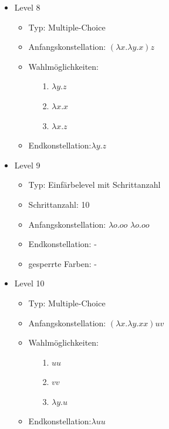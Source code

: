 \begin{itemize}
	\item{Level 8} 
		\begin{itemize}
			\item{Typ:} Multiple-Choice 
			\item{Anfangskonstellation:} \((\lambda x . \lambda y . x ) z\)    
			\item{Wahlmöglichkeiten:}  
				\begin{itemize}
					\item[1.] \( \lambda y . z\) 
					\item[2.] \( \lambda x . x \) 
					\item[3.] \( \lambda x . z\)
				\end{itemize}
			\item{Endkonstellation:}\( \lambda y . z\)
		\end{itemize}

	\item{Level 9} 
		\begin{itemize}
			\item{Typ:} Einfärbelevel mit Schrittanzahl
			\item{Schrittanzahl:} 10
			\item{Anfangskonstellation:} \(\lambda o . o o \)  \(\lambda o . o o \) 
			\item{Endkonstellation:}  -
			\item{gesperrte Farben:} -
		\end{itemize}

	\item{Level 10} 
		\begin{itemize}
			\item{Typ:} Multiple-Choice 
			\item{Anfangskonstellation:} \((\lambda x . \lambda y . x x ) u v\)    
			\item{Wahlmöglichkeiten:}  
				\begin{itemize}
					\item[1.] \( u u\) 
					\item[2.] \( v v \) 
					\item[3.] \( \lambda y . u\)
				\end{itemize}
			\item{Endkonstellation:}\( \lambda u u\)
		\end{itemize}



\end{itemize}
